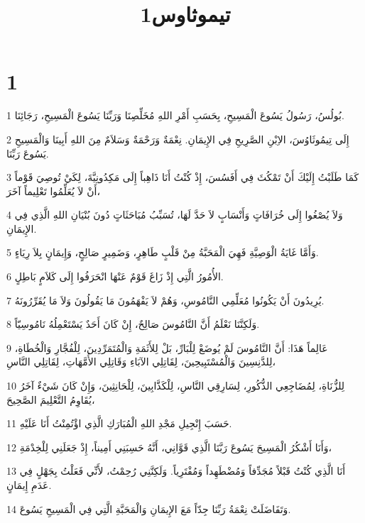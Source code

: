 

\title{تيموثاوس1}


\chapter{1}

\par 1 بُولُسُ، رَسُولُ يَسُوعَ الْمَسِيحِ، بِحَسَبِ أَمْرِ اللهِ مُخَلِّصِنَا وَرَبِّنَا يَسُوعَ الْمَسِيحِ، رَجَائِنَا.
\par 2 إِلَى تِيمُوثَاوُسَ، الاِبْنِ الصَّرِيحِ فِي الإِيمَانِ. نِعْمَةٌ وَرَحْمَةٌ وَسَلاَمٌ مِنَ اللهِ أَبِينَا وَالْمَسِيحِ يَسُوعَ رَبِّنَا.
\par 3 كَمَا طَلَبْتُ إِلَيْكَ أَنْ تَمْكُثَ فِي أَفَسُسَ، إِذْ كُنْتُ أَنَا ذَاهِباً إِلَى مَكِدُونِيَّةَ، لِكَيْ تُوصِيَ قَوْماً أَنْ لاَ يُعَلِّمُوا تَعْلِيماً آخَرَ،
\par 4 وَلاَ يُصْغُوا إِلَى خُرَافَاتٍ وَأَنْسَابٍ لاَ حَدَّ لَهَا، تُسَبِّبُ مُبَاحَثَاتٍ دُونَ بُنْيَانِ اللهِ الَّذِي فِي الإِيمَانِ.
\par 5 وَأَمَّا غَايَةُ الْوَصِيَّةِ فَهِيَ الْمَحَبَّةُ مِنْ قَلْبٍ طَاهِرٍ، وَضَمِيرٍ صَالِحٍ، وَإِيمَانٍ بِلاَ رِيَاءٍ.
\par 6 الأُمُورُ الَّتِي إِذْ زَاغَ قَوْمٌ عَنْهَا انْحَرَفُوا إِلَى كَلاَمٍ بَاطِلٍ.
\par 7 يُرِيدُونَ أَنْ يَكُونُوا مُعَلِّمِي النَّامُوسِ، وَهُمْ لاَ يَفْهَمُونَ مَا يَقُولُونَ وَلاَ مَا يُقَرِّرُونَهُ.
\par 8 وَلَكِنَّنَا نَعْلَمُ أَنَّ النَّامُوسَ صَالِحٌ، إِنْ كَانَ أَحَدٌ يَسْتَعْمِلُهُ نَامُوسِيّاً.
\par 9 عَالِماً هَذَا: أَنَّ النَّامُوسَ لَمْ يُوضَعْ لِلْبَارِّ، بَلْ لِلأَثَمَةِ وَالْمُتَمَرِّدِينَ، لِلْفُجَّارِ وَالْخُطَاةِ، لِلدَّنِسِينَ وَالْمُسْتَبِيحِينَ، لِقَاتِلِي الآبَاءِ وَقَاتِلِي الأُمَّهَاتِ، لِقَاتِلِي النَّاسِ،
\par 10 لِلزُّنَاةِ، لِمُضَاجِعِي الذُّكُورِ، لِسَارِقِي النَّاسِ، لِلْكَذَّابِينَ، لِلْحَانِثِينَ، وَإِنْ كَانَ شَيْءٌ آخَرُ يُقَاوِمُ التَّعْلِيمَ الصَّحِيحَ،
\par 11 حَسَبَ إِنْجِيلِ مَجْدِ اللهِ الْمُبَارَكِ الَّذِي اؤْتُمِنْتُ أَنَا عَلَيْهِ.
\par 12 وَأَنَا أَشْكُرُ الْمَسِيحَ يَسُوعَ رَبَّنَا الَّذِي قَوَّانِي، أَنَّهُ حَسِبَنِي أَمِيناً، إِذْ جَعَلَنِي لِلْخِدْمَةِ،
\par 13 أَنَا الَّذِي كُنْتُ قَبْلاً مُجَدِّفاً وَمُضْطَهِداً وَمُفْتَرِياً. وَلَكِنَّنِي رُحِمْتُ، لأَنِّي فَعَلْتُ بِجَهْلٍ فِي عَدَمِ إِيمَانٍ.
\par 14 وَتَفَاضَلَتْ نِعْمَةُ رَبِّنَا جِدّاً مَعَ الإِيمَانِ وَالْمَحَبَّةِ الَّتِي فِي الْمَسِيحِ يَسُوعَ.
